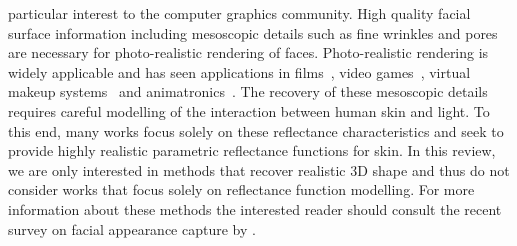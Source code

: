 particular interest to the computer graphics community. High quality facial
surface information including mesoscopic details such as fine wrinkles and pores
are necessary for photo-realistic rendering of faces. Photo-realistic rendering
is widely applicable and has seen applications in
films~\cite{borshukov2005universal}, video games~\cite{vonderPahlen:2014kg},
virtual makeup systems~\cite{scherbaum2011computer} and
animatronics~\cite{jung2011believable}. The recovery of these mesoscopic details
requires careful modelling of the interaction between human skin and light. To
this end, many works focus solely on these reflectance characteristics and seek
to provide highly realistic parametric reflectance functions for skin. In this
review, we are only interested in methods that recover realistic 3D shape and
thus do not consider works that focus solely on reflectance function modelling.
For more information about these methods the interested reader should consult
the recent survey on facial appearance capture by \citet{Klehm:2015jb}.

